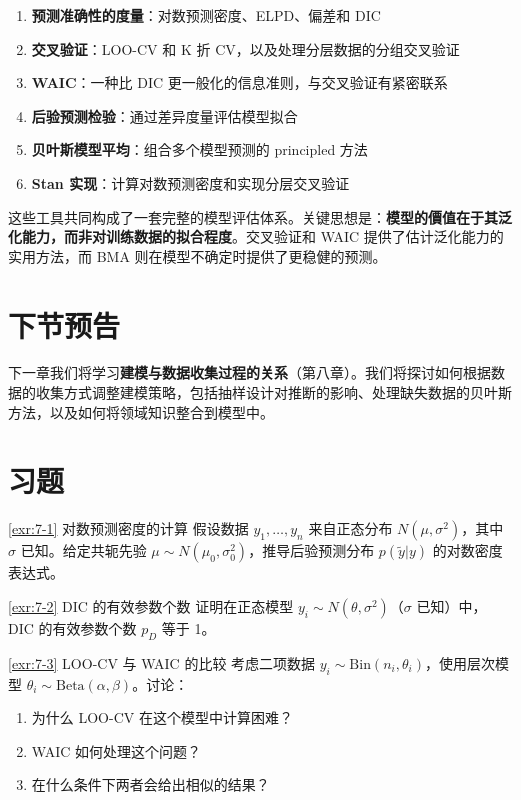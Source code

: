 \begin{enumerate}
  \item \textbf{预测准确性的度量}：对数预测密度、ELPD、偏差和 DIC
  \item \textbf{交叉验证}：LOO-CV 和 K 折 CV，以及处理分层数据的分组交叉验证
  \item \textbf{WAIC}：一种比 DIC 更一般化的信息准则，与交叉验证有紧密联系
  \item \textbf{后验预测检验}：通过差异度量评估模型拟合
  \item \textbf{贝叶斯模型平均}：组合多个模型预测的 principled 方法
  \item \textbf{Stan 实现}：计算对数预测密度和实现分层交叉验证
\end{enumerate}

这些工具共同构成了一套完整的模型评估体系。关键思想是：\textbf{模型的價值在于其泛化能力，而非对训练数据的拟合程度}。交叉验证和 WAIC 提供了估计泛化能力的实用方法，而 BMA 则在模型不确定时提供了更稳健的预测。

\section{下节预告}

下一章我们将学习\textbf{建模与数据收集过程的关系}（第八章）。我们将探讨如何根据数据的收集方式调整建模策略，包括抽样设计对推断的影响、处理缺失数据的贝叶斯方法，以及如何将领域知识整合到模型中。

\section{习题}\label{sec:chapter7-exercises}

\begin{Exercise}{\ref{exr:7-1} 对数预测密度的计算}
  假设数据 $y_1, \ldots, y_n$ 来自正态分布 $N(\mu, \sigma^2)$，其中 $\sigma$ 已知。给定共轭先验 $\mu \sim N(\mu_0, \sigma_0^2)$，推导后验预测分布 $p(\tilde{y} | y)$ 的对数密度表达式。
\end{Exercise}

\begin{Exercise}{\ref{exr:7-2} DIC 的有效参数个数}
  证明在正态模型 $y_i \sim N(\theta, \sigma^2)$（$\sigma$ 已知）中，DIC 的有效参数个数 $p_D$ 等于 1。
\end{Exercise}

\begin{Exercise}{\ref{exr:7-3} LOO-CV 与 WAIC 的比较}
  考虑二项数据 $y_i \sim \text{Bin}(n_i, \theta_i)$，使用层次模型 $\theta_i \sim \text{Beta}(\alpha, \beta)$。讨论：
  \begin{enumerate}
    \item 为什么 LOO-CV 在这个模型中计算困难？
    \item WAIC 如何处理这个问题？
    \item 在什么条件下两者会给出相似的结果？
  \end{enumerate}
\end{Exercise}

